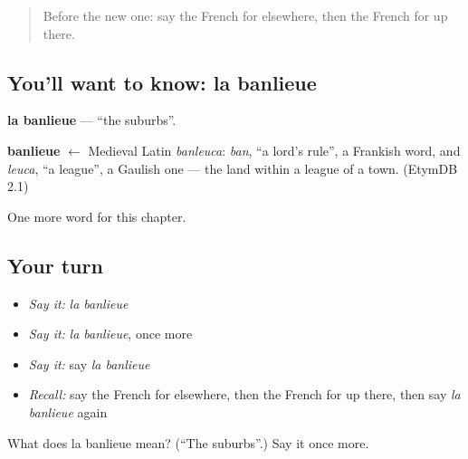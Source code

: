 \label{lesson:FR-C216-banlieue}



\begin{quote}
Before the new one: say the French for elsewhere, then the French for up there.
\end{quote}

\subsection*{You'll want to know: la banlieue}
\textbf{la banlieue} — \textquotedblleft{}the suburbs\textquotedblright{}.

\begin{cousinweb}
\textbf{banlieue} $\leftarrow$ Medieval Latin \emph{banleuca}: \emph{ban}, \textquotedblleft{}a lord's rule\textquotedblright{}, a Frankish word, and \emph{leuca}, \textquotedblleft{}a league\textquotedblright{}, a Gaulish one — the land within a league of a town. (EtymDB 2.1)
\end{cousinweb}

\begin{grammarlens}[title={What you've built}]
One more word for this chapter.
\end{grammarlens}

\subsection*{Your turn}
\begin{itemize}
\raggedright
  \item \emph{Say it:} \emph{la banlieue}
  \item \emph{Say it:} \emph{la banlieue}, once more
  \item \emph{Say it:} say \emph{la banlieue}
  \item \emph{Recall:} say the French for elsewhere, then the French for up there, then say \emph{la banlieue} again
\end{itemize}

\begin{tcolorbox}[breakable,colback=teal!4,colframe=teal!35!black,title={Before you move on}]
What does la banlieue mean? (\textquotedblleft{}The suburbs\textquotedblright{}.) Say it once more.
\end{tcolorbox}
